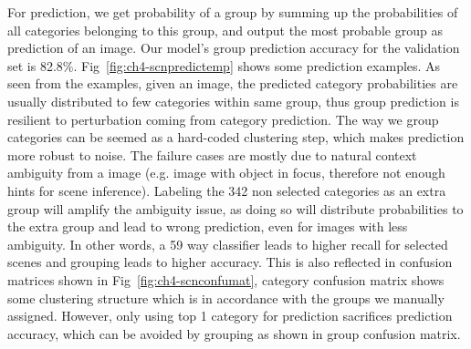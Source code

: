 For prediction, we get probability of a group by summing up the probabilities of all categories belonging to this group, and output the most probable group as prediction of an image. Our model's group prediction accuracy for the validation set is 82.8\%. Fig~\ref{fig:ch4-scnpredictemp} shows some prediction examples. As seen from the examples, given an image, the predicted category probabilities are usually distributed to few categories within same group, thus group prediction is resilient to perturbation coming from category prediction. The way we group categories can be seemed as a hard-coded clustering step, which makes prediction more robust to noise. The failure cases are mostly due to natural context ambiguity from a image (e.g. image with object in focus, therefore not enough hints for scene inference). Labeling the 342 non selected categories as an extra group will amplify the ambiguity issue, as doing so will distribute probabilities to the extra group and lead to wrong prediction, even for images with less ambiguity. In other words, a 59 way classifier leads to higher recall for selected scenes and grouping leads to higher accuracy. This is also reflected in confusion matrices shown in Fig~\ref{fig:ch4-scnconfumat}, category confusion matrix shows some clustering structure which is in accordance with the groups we manually assigned. However, only using top 1 category for prediction sacrifices prediction accuracy, which can be avoided by grouping as shown in group confusion matrix.

